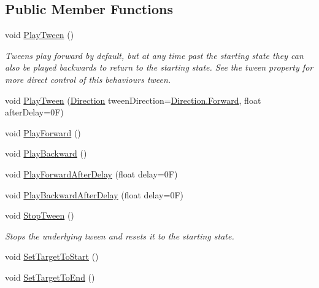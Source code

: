 \subsection*{Public Member Functions}
\begin{DoxyCompactItemize}
\item 
void \mbox{\hyperlink{class_leap_1_1_unity_1_1_animation_1_1_transform_tween_behaviour_a8b948d1ea92a1f721c35ad38fb5224f1}{Play\+Tween}} ()
\begin{DoxyCompactList}\small\item\em Tweens play forward by default, but at any time past the starting state they can also be played backwards to return to the starting state. See the tween property for more direct control of this behaviour\textquotesingle{}s tween. \end{DoxyCompactList}\item 
void \mbox{\hyperlink{class_leap_1_1_unity_1_1_animation_1_1_transform_tween_behaviour_a1e24c5728cfe31a923d49a62cf3bd6dd}{Play\+Tween}} (\mbox{\hyperlink{namespace_leap_1_1_unity_1_1_animation_ab080d4756e4d3d6a2fc9cd9a7f4e695a}{Direction}} tween\+Direction=\mbox{\hyperlink{namespace_leap_1_1_unity_1_1_animation_ab080d4756e4d3d6a2fc9cd9a7f4e695aa67d2f6740a8eaebf4d5c6f79be8da481}{Direction.\+Forward}}, float after\+Delay=0\+F)
\item 
void \mbox{\hyperlink{class_leap_1_1_unity_1_1_animation_1_1_transform_tween_behaviour_a3c59a5aa9be4cdbd0bd087400d8e3921}{Play\+Forward}} ()
\item 
void \mbox{\hyperlink{class_leap_1_1_unity_1_1_animation_1_1_transform_tween_behaviour_aff7a741293c6403f3b383703c0828684}{Play\+Backward}} ()
\item 
void \mbox{\hyperlink{class_leap_1_1_unity_1_1_animation_1_1_transform_tween_behaviour_ad8f4e32c9075b3548e4d676f6cb48ec8}{Play\+Forward\+After\+Delay}} (float delay=0\+F)
\item 
void \mbox{\hyperlink{class_leap_1_1_unity_1_1_animation_1_1_transform_tween_behaviour_a6a5373e94cbe5b34ff960a2c7e8a608b}{Play\+Backward\+After\+Delay}} (float delay=0\+F)
\item 
void \mbox{\hyperlink{class_leap_1_1_unity_1_1_animation_1_1_transform_tween_behaviour_a02f42a682cddb8cde125a780d2796fd8}{Stop\+Tween}} ()
\begin{DoxyCompactList}\small\item\em Stops the underlying tween and resets it to the starting state. \end{DoxyCompactList}\item 
void \mbox{\hyperlink{class_leap_1_1_unity_1_1_animation_1_1_transform_tween_behaviour_a2173b8677ca69eb114b7f98d27532e17}{Set\+Target\+To\+Start}} ()
\item 
void \mbox{\hyperlink{class_leap_1_1_unity_1_1_animation_1_1_transform_tween_behaviour_a9229f302adb68fc39554ccad0d49fd1c}{Set\+Target\+To\+End}} ()
\end{DoxyCompactItemize}
